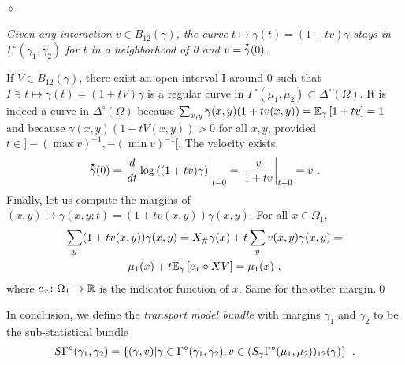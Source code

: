 \documentclass[runningheads]{llncs}
\begin{document}
\paragraph{$\bm\diamond$} \emph{Given any interaction $v \in B_{12}(\gamma)$, the curve $t \mapsto \gamma(t) = (1+tv)\gamma$ stays in $\Gamma^\circ(\gamma_1,\gamma_2)$ for $t$ in a neighborhood of 0 and $v = \overset{\star}{\gamma}(0)$.} 

If $V \in B_{12}(\gamma)$, there exist an open interval I around 0 such that $I \ni t \mapsto \gamma(t) = (1+tV)\gamma$ is a regular curve in $\Gamma^\circ(\mu_1,\mu_2) \subset \Delta^\circ(\Omega)$. It is indeed a curve in $\Delta^\circ(\Omega)$ because $\sum_{x,y} \gamma(x,y)(1+tv(x,y)) = {\operatorname{\mathbb E}}_{\gamma}\left[1+tv\right] = 1$ and because $\gamma(x,y)(1+tV(x,y)) > 0$ for all $x,y$, provided $t \in ]- (\max v)^{-1}, - (\min v)^{-1}[$.  The velocity exists,
%
\    \begin{equation*}
     \overset{\star}{\gamma}(0) = \left.  \frac{d}{dt} \log\left( (1+tv)\gamma \right) \right|_{t=0} = \left. \frac v {1+tv} \right|_{t=0} = v \ .
    \end{equation*}
%
Finally, let us compute the margins of $(x,y) \mapsto \gamma(x,y;t) = (1+tv(x,y))\gamma(x,y)$. For all $x \in \Omega_1$,
%
\begin{multline*}
  \sum_y (1+tv(x,y))\gamma(x,y) = X_\# \gamma(x) + t \sum_y v(x,y)\gamma(x,y) = \\ \mu_1(x) + t {\operatorname{\mathbb E}}_{\gamma}\left[e_x\circ X V\right] = \mu_1(x) \ ,
\end{multline*}
%
where $e_x \colon \Omega_1 \to \mathbb R$ is the indicator function of $x$. Same for the other margin.\qed

%
In conclusion, we define the \emph{transport model bundle} with margins $\gamma_1$ and $\gamma_2$ to be the sub-statistical bundle
%
\begin{equation} \label{eq:2}
  S\Gamma^\circ(\gamma_1,\gamma_2) = \left\{ (\gamma,v) \middle| \gamma\in\Gamma^\circ(\gamma_1,\gamma_2),v \in (S_\gamma\Gamma^\circ(\mu_1,\mu_2))_{12}(\gamma) \right\} \ .
\end{equation}
\end{document}
